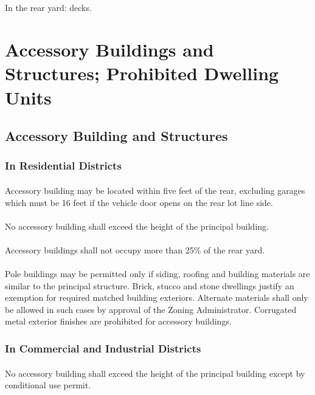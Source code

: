 \subsection{}
In the rear yard:  decks.

\section{Accessory Buildings and Structures; Prohibited Dwelling Units}
\subsection{Accessory Building and Structures}
\subsubsection{In Residential Districts}
\paragraph{}
Accessory building may be located within five feet of the rear, excluding garages which must be 16 feet if the vehicle door opens on the rear lot line side.
\paragraph{}
No accessory building shall exceed the height of the principal building.
\paragraph{}
Accessory buildings shall not occupy more than 25\% of the rear yard.
\paragraph{}
Pole buildings may be permitted only if siding, roofing and building materials are similar to the principal structure. Brick, stucco and stone dwellings justify an exemption for required matched building exteriors. Alternate materials shall only be allowed in such cases by approval of the Zoning Administrator. Corrugated metal exterior finishes are prohibited for accessory buildings.
\subsubsection{In Commercial and Industrial Districts}
\paragraph{}
No accessory building shall exceed the height of the principal building except by conditional use permit.
